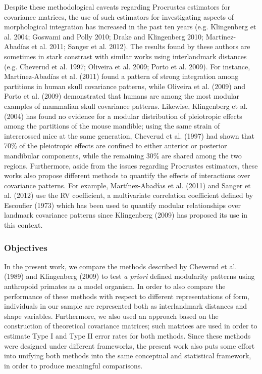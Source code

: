\documentclass[12pt,]{article}
\begin{document}
Despite these methodological caveats regarding Procrustes estimators for
covariance matrices, the use of such estimators for investigating
aspects of morphological integration has increased in the past ten years
(e.g. Klingenberg et al. 2004; Goswami and Polly 2010; Drake and
Klingenberg 2010; Martínez-Abadías et al. 2011; Sanger et al. 2012). The
results found by these authors are sometimes in stark constrast with
similar works using interlandmark distances (e.g. Cheverud et al. 1997;
Oliveira et al. 2009; Porto et al. 2009). For instance, Martínez-Abadías
et al. (2011) found a pattern of strong integration among partitions in
human skull covariance patterns, while Oliveira et al. (2009) and Porto
et al. (2009) demonstrated that humans are among the most modular
examples of mammalian skull covariance patterns. Likewise, Klingenberg
et al. (2004) has found no evidence for a modular distribution of
pleiotropic effects among the partitions of the mouse mandible; using
the same strain of intercrossed mice at the same generation, Cheverud et
al. (1997) had shown that 70\% of the pleiotropic effects are confined
to either anterior or posterior mandibular components, while the
remaining 30\% are shared among the two regions. Furthermore, aside from
the issues regarding Procrustes estimators, these works also propose
different methods to quantify the effects of interactions over
covariance patterns. For example, Martínez-Abadías et al. (2011) and
Sanger et al. (2012) use the RV coefficient, a multivariate correlation
coefficient defined by Escoufier (1973) which has been used to quantify
modular relationships over landmark covariance patterns since
Klingenberg (2009) has proposed its use in this context.

\subsubsection{Objectives}\label{objectives}

In the present work, we compare the methods described by Cheverud et al.
(1989) and Klingenberg (2009) to test \emph{a priori} defined modularity
patterns using anthropoid primates as a model organism. In order to also
compare the performance of these methods with respect to different
representations of form, individuals in our sample are represented both
as interlandmark distances and shape variables. Furthermore, we also
used an approach based on the construction of theoretical covariance
matrices; such matrices are used in order to estimate Type I and Type II
error rates for both methods. Since these methods were designed under
different frameworks, the present work also puts some effort into
unifying both methods into the same conceptual and statistical
framework, in order to produce meaningful comparisons.
\end{document}
